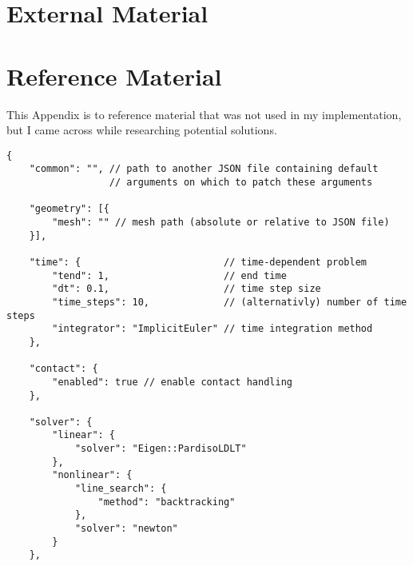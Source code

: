 \begin{appendices}
%
%
\chapter{External Material}




%
%

\chapter{Reference Material}

This Appendix is to reference material that was not used in my implementation, but I came across while researching potential solutions.

\begin{listing}
\begin{verbatim}
{
    "common": "", // path to another JSON file containing default 
                  // arguments on which to patch these arguments

    "geometry": [{
        "mesh": "" // mesh path (absolute or relative to JSON file)
    }],

    "time": {                         // time-dependent problem
        "tend": 1,                    // end time
        "dt": 0.1,                    // time step size
        "time_steps": 10,             // (alternativly) number of time steps
        "integrator": "ImplicitEuler" // time integration method
    },

    "contact": {
        "enabled": true // enable contact handling
    },

    "solver": {
        "linear": {
            "solver": "Eigen::PardisoLDLT"
        },
        "nonlinear": {
            "line_search": {
                "method": "backtracking"
            },
            "solver": "newton"
        }
    },


\end{verbatim}
\end{listing}
\end{appendices}
